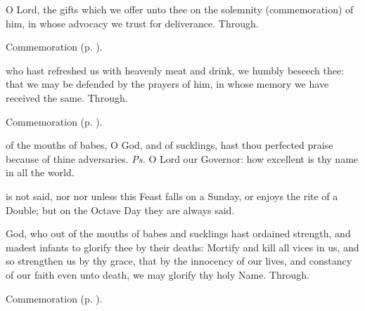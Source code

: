 
\secret
{} O Lord, the gifts which we offer unto thee on the solemnity (commemoration) of him, in whose advocacy we trust for deliverance. Through.

\begin{rubric}
    Commemoration  (p. \pageref{NativityMassIIISecret}).
\end{rubric}

\postcommunion
{} who hast refreshed us with heavenly meat and drink, we humbly beseech thee: that we may be defended by the prayers of him, in whose memory we have received the same. Through.

\begin{rubric}
    Commemoration  (p. \pageref{NativityMassIIIPostcommunion}).
\end{rubric}


\clearpage
{}\label{HolyInnocents}

\introit
{} of the mouths of babes, O God, and of sucklings, hast thou perfected praise because of thine adversaries. \textit{Ps.} O Lord our Governor: how excellent is thy name in all the world.
\begin{rubric}
     is not said, nor  nor  unless this Feast falls on a Sunday, or enjoys the rite of a  Double; but on the Octave Day they are always said.
\end{rubric}
\collect
{} God, who out of the mouths of babes and sucklings hast ordained strength, and madest infants to glorify thee by their deaths: Mortify and kill all vices in us, and so strengthen us by thy grace, that by the innocency of our lives, and constancy of our faith even unto death, we may glorify thy holy Name. Through.

\begin{rubric}
    Commemoration  (p. \pageref{NativityMassIIICollect}).
\end{rubric}

